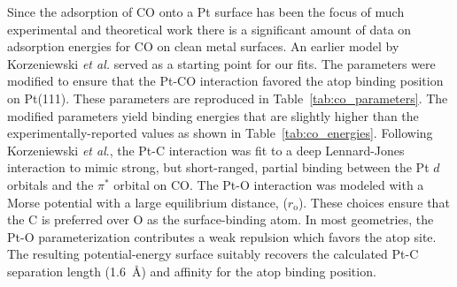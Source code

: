 Since the adsorption of CO onto a Pt surface has been the focus
of much experimental \citep{Ertl:1977cg, Kelemen:1979ad, Yeo:1997th, Hopster:1978yf}
and theoretical work
\citep{Deshlahra:2009wu, Feibelman:2001qa, Beurden:2002ys, Korzeniewski:1986kl, Mason:2004ix}
there is a significant amount of data on adsorption energies for CO on
clean metal surfaces. An earlier model by Korzeniewski {\it et
  al.}\citep{Korzeniewski:1986kl} served as a starting point for our fits. The parameters were
modified to ensure that the Pt-CO interaction favored the atop binding
position on Pt(111). These parameters are reproduced in Table~\ref{tab:co_parameters}.
The modified parameters yield binding energies that are slightly higher
than the experimentally-reported values as shown in Table~\ref{tab:co_energies}. Following Korzeniewski
{\it et al}.,\citep{Korzeniewski:1986kl} the Pt-C interaction was fit to a deep
Lennard-Jones interaction to mimic strong, but short-ranged, partial
binding between the Pt $d$ orbitals and the $\pi^*$ orbital on CO. The
Pt-O interaction was modeled with a Morse potential with a large
equilibrium distance, ($r_{\mathrm{o}}$).  These choices ensure that the C is preferred
over O as the surface-binding atom. In most geometries, the Pt-O parameterization contributes a weak
repulsion which favors the atop site.  The resulting potential-energy
surface suitably recovers the calculated Pt-C separation length
(1.6~\AA)\citep{Beurden:2002ys} and affinity for the atop binding
position.\citep{Deshlahra:2012aa, Hopster:1978yf}

